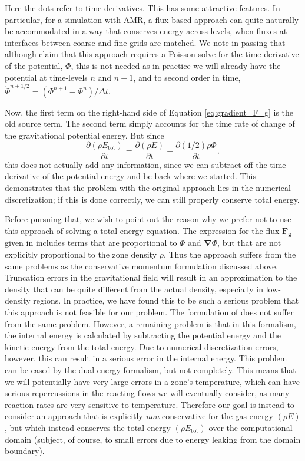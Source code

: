 \documentclass{emulateapj}
\begin{document}
Here the dots refer to time derivatives. This has some attractive features. 
In particular, for a simulation with AMR, a flux-based approach
can quite naturally be accommodated in a way that conserves energy across levels, when fluxes
at interfaces between coarse and fine grids are matched. We note in passing that although
\citeauthor{jiang:2013} claim that this approach requires a Poisson solve for the time derivative of the potential,
$\dot{\Phi}$, this is not needed as in practice we will already have the potential at time-levels
$n$ and $n+1$, and to second order in time, $\dot{\Phi}^{n+1/2} = (\Phi^{n+1} - \Phi^{n}) / \Delta t.$

Now, the first term on the right-hand side of Equation \ref{eq:gradient_F_g} is the old source term. The second term simply 
accounts for the time rate of change of the gravitational potential energy. But since
\begin{equation}
  \frac{\partial(\rho E_{\text{tot}})}{\partial t} = \frac{\partial (\rho E)}{\partial t} + \frac{\partial (1/2) \rho \Phi}{\partial t},
\end{equation}
this does not actually add any information, since we can subtract off the time derivative 
of the potential energy and be back where we started. This demonstrates that the problem
with the original approach lies in the numerical discretization; if this is done correctly,
we can still properly conserve total energy.

Before pursuing that, we wish to point out the reason why we prefer not to use this 
approach of solving a total energy equation. The expression for the flux $\mathbf{F_g}$
given in \cite{jiang:2013} includes terms that are proportional to $\Phi$ and ${\bm{\nabla}} \Phi$,
but that are not explicitly proportional to the zone density $\rho$. Thus the approach suffers
from the same problems as the conservative momentum formulation discussed above. Truncation errors
in the gravitational field will result in an approximation to the density that can be quite 
different from the actual density, especially in low-density regions. In practice,
we have found this to be such a serious problem that this approach is not feasible for our problem.
The formulation of \cite{marcello:2012} does not suffer from the same problem. However, a 
remaining problem is that in this formalism, the internal energy
is calculated by subtracting the potential energy and the kinetic energy from the 
total energy. Due to numerical discretization errors, however, this can result in a serious 
error in the internal energy. This problem can be eased by the dual energy formalism,
but not completely. This means that we will potentially have very large errors in a 
zone's temperature, which can have serious repercussions in the reacting flows we will eventually consider,
as many reaction rates are very sensitive to temperature. Therefore our goal is instead to consider an approach
that is explicitly \textit{non}-conservative for the gas energy $(\rho E)$, but which
instead conserves the total energy $(\rho E_{\text{tot}})$ over the computational domain 
(subject, of course, to small errors due to energy leaking from the domain boundary).
\end{document}
